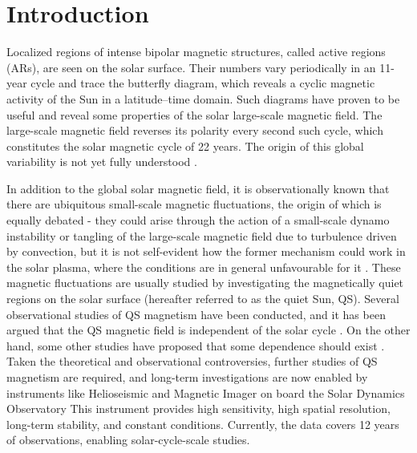 \documentclass{aa}
\begin{document}
\maketitle

\section{Introduction} \label{sec:intro}

Localized regions of intense bipolar magnetic structures, called active regions
(ARs), are seen on the solar surface. Their numbers vary periodically 
in an 11-year cycle
and trace the
butterfly 
diagram,
which 
reveals 
a cyclic magnetic activity of the Sun in a latitude--time
domain. Such diagrams have proven to be useful and reveal some properties of 
the solar large-scale magnetic field. The large-scale magnetic field reverses its polarity every
second such cycle, which constitutes the solar magnetic cycle of 22 years. The origin of this
global variability is not yet fully understood \citep[see, e.g.,][]{char10}.

In addition to the global solar magnetic field, it is observationally known that there are ubiquitous small-scale magnetic fluctuations, the origin of which is equally debated - they could arise through the action of a small-scale dynamo instability or tangling of the large-scale magnetic field due to turbulence driven by convection, but it is not self-evident how the former mechanism could work in the solar plasma, where the conditions are in general unfavourable for it \citep[see, e.g.][]{BS05}. These magnetic fluctuations are usually studied by investigating the magnetically quiet regions on the solar surface (hereafter referred to as the quiet Sun, QS). Several observational
studies of QS magnetism have been conducted, and it has been argued
that the QS magnetic field is 
independent of the solar cycle 
\cite[see, e.g.,][]{Kleint+10,Buehler+13,Faurobert+15,Jin+15b,Jin+15a}. On the other hand, some other studies have proposed
that some dependence should exist \cite[e.g.][]{Lites+14,Meunier06,Faurobert+21}. 
Taken the theoretical and observational controversies, further studies of QS magnetism are required, and long-term investigations are now enabled by instruments like
Helioseismic and Magnetic Imager \cite[HMI,][]{2012SoPh..275..207S,2012SoPh..275..229S} on board the Solar Dynamics Observatory \cite[SDO,][]{2012SoPh..275....3P}
This instrument
provides high sensitivity, high spatial
resolution, long-term stability, and constant conditions. Currently, the data covers 12 years of observations, enabling solar-cycle-scale studies.
\end{document}
